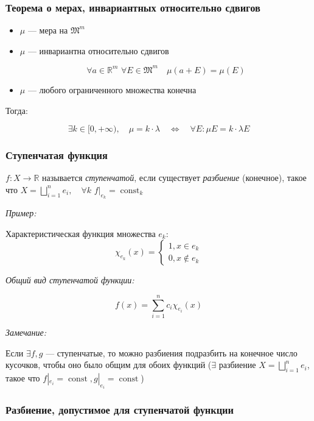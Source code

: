 \documentclass{article}
\def\dbl{\,\,}
\DeclareMathOperator{\const}{const}
\begin{document}
\subsubsection{Теорема о мерах, инвариантных относительно сдвигов}

\begin{itemize}
    \item $\mu$ --- мера на $\mathfrak{M}^m$
    \item $\mu$ --- инвариантна относительно сдвигов 
    
    \[\forall a \in \mathbb{R}^m \dbl \forall E \in \mathfrak{M}^m \quad \mu(a + E) = \mu(E)\]

    \item $\mu$ --- любого ограниченного множества конечна
\end{itemize}

Тогда:

\[\exists k \in [0, +\infty), \quad \mu = k \cdot \lambda \quad \Leftrightarrow \quad \forall E: \mu E = k \cdot \lambda E\]

\subsubsection{Ступенчатая функция}

$f: X \rightarrow \mathbb{R}$ называется \textit{ступенчатой}, если существует \textit{разбиение} (конечное), такое что $X = \bigsqcup_{i = 1}^{n} e_i, \quad \forall k \dbl f|_{e_k} = \const_k$

\textit{Пример:}

Характеристическая функция множества $e_k$: 
\[\chi_{e_k}(x) = \begin{cases}
    1, x \in e_k \\
    0, x \notin e_k
\end{cases}\]

\textit{Общий вид ступенчатой функции:}

\[f(x) = \sum_{i = 1}^{n} c_i \chi_{e_i}(x)\]

\textit{Замечание:}

Если $\exists f, g$ --- ступенчатые, то можно разбиения подразбить на конечное число кусочков, чтобы оно было общим для обоих функций ($\exists$ разбиение $X = \bigsqcup_{i = 1}^{n} e_i$, такое что $f|_{e_i} = \const, g|_{e_i} = \const$)

\subsubsection{Разбиение, допустимое для ступенчатой функции}
\end{document}
